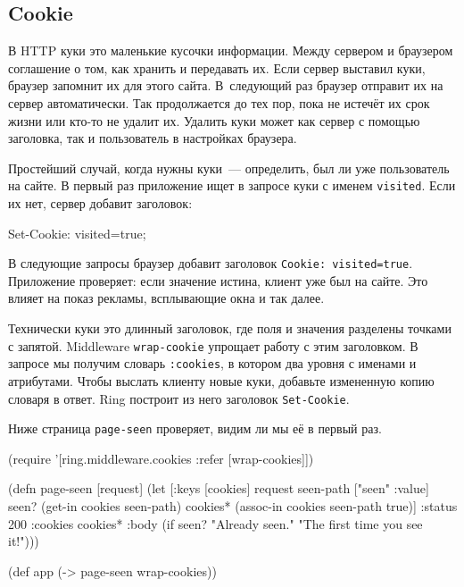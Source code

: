 \subsection{Cookie}


В HTTP куки это маленькие кусочки информации. Между сервером и браузером
соглашение о том, как хранить и передавать их. Если сервер выставил куки,
браузер запомнит их для этого сайта. В~следующий раз браузер отправит их на
сервер автоматически. Так продолжается до тех пор, пока не истечёт их срок
жизни или кто-то не удалит их. Удалить куки может как сервер с помощью
заголовка, так и пользователь в настройках браузера.

Простейший случай, когда нужны куки~--- определить, был ли уже пользователь на
сайте. В первый раз приложение ищет в запросе куки с именем
\verb|visited|. Если их нет, сервер добавит заголовок:

\begin{english}
  \begin{http}
Set-Cookie: visited=true;
  \end{http}
\end{english}

В следующие запросы браузер добавит заголовок \verb|Cookie: visited=true|.
Приложение проверяет: если значение истина, клиент уже был на сайте. Это влияет
на показ рекламы, всплывающие окна и так далее.

Технически куки это длинный заголовок, где поля и значения разделены точками с
запятой. Middleware \verb|wrap-cookie| упрощает работу с этим заголовком. В
запросе мы получим словарь \verb|:cookies|, в котором два уровня с именами и
атрибутами. Чтобы выслать клиенту новые куки, добавьте измененную копию словаря
в ответ. Ring построит из него заголовок \verb|Set-Cookie|.

Ниже страница \verb|page-seen| проверяет, видим ли мы её в первый раз.



\begin{english}
  \begin{clojure/lines}
(require '[ring.middleware.cookies
           :refer [wrap-cookies]])

(defn page-seen [request]
  (let [{:keys [cookies]} request
        seen-path ["seen" :value]
        seen? (get-in cookies seen-path)
        cookies* (assoc-in cookies seen-path true)]
    {:status 200
     :cookies cookies*
     :body (if seen?
             "Already seen."
             "The first time you see it!")}))

(def app (-> page-seen
             wrap-cookies))
  \end{clojure/lines}
\end{english}

